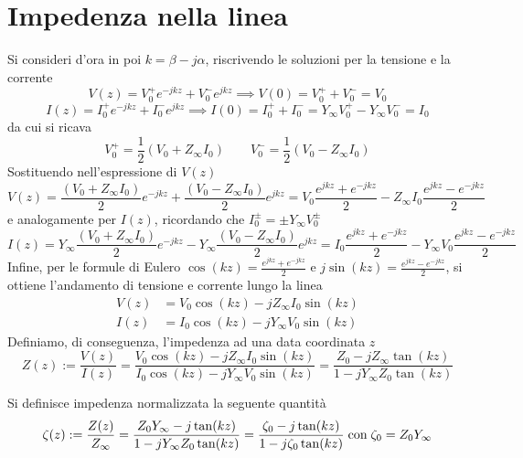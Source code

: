 \section{Impedenza nella linea}
    Si consideri d'ora in poi $k = \beta - j \alpha$, riscrivendo le soluzioni per la tensione e la corrente
    \[
        V(z) = V^+_0 e^{-jkz} + V^-_0 e^{jkz}
        \implies V(0) = V^+_0 + V^-_0 =
        V_0
    \]
    \[
        I(z) = I^+_0 e^{-jkz} + I^-_0 e^{jkz}
        \implies I(0) = I^+_0 + I^-_0 =
        Y_{\infty} V^+_0 - Y_{\infty} V^-_0 =
        I_0
    \]
    da cui si ricava
    \[
        V^+_0 = \frac{1}{2} (V_0 + Z_\infty I_0) \qquad V^-_0 = \frac{1}{2} (V_0 - Z_\infty I_0)
    \]
    Sostituendo nell'espressione di $V(z)$
    \[
        V(z) = \frac{(V_0 + Z_\infty I_0)}{2} e^{-jkz} + \frac{(V_0 - Z_\infty I_0)}{2} e^{jkz} =
        V_0 \frac{e^{jkz} + e^{-jkz}}{2} - Z_\infty I_0 \frac{e^{jkz} - e^{-jkz}}{2}
    \]
    e analogamente per $I(z)$, ricordando che $I^\pm_0 = \pm Y_\infty V^\pm_0$
    \[
        I(z) = Y_\infty \frac{(V_0 + Z_\infty I_0)}{2} e^{-jkz} - Y_\infty \frac{(V_0 - Z_\infty I_0)}{2} e^{jkz} =
        I_0 \frac{e^{jkz} + e^{-jkz}}{2} - Y_\infty V_0 \frac{e^{jkz} - e^{-jkz}}{2}
    \]
    Infine, per le formule di Eulero $\cos(kz) = \frac{e^{jkz} + e^{-jkz}}{2}$ e $j \sin(kz) = \frac{e^{jkz} - e^{-jkz}}{2}$, si ottiene l'andamento di tensione e corrente lungo la linea
    \[
        \begin{aligned}
            V(z) &= V_0 \cos(kz) - j Z_\infty I_0 \sin(kz) \\
            I(z) &= I_0 \cos(kz) - j Y_\infty V_0 \sin(kz)
        \end{aligned}
    \]
    Definiamo, di conseguenza, l'impedenza ad una data coordinata $z$
    \[
        Z(z) := \frac{V(z)}{I(z)} = \frac{V_0 \cos(kz) - j Z_\infty I_0 \sin(kz)}{I_0 \cos(kz) - j Y_\infty V_0 \sin(kz)} = \frac{Z_0 - j Z_\infty \tan(kz)}{1 - j Y_\infty Z_0 \tan(kz)}
    \]

    \begin{definition}
        Si definisce impedenza normalizzata la seguente quantità
        \[
            \zeta(z) := \frac{Z(z)}{Z_\infty} = \frac{Z_0 Y_\infty - j \tan(kz)}{1 - j Y_\infty Z_0 \tan(kz)} = \frac{\zeta_0 - j \tan(kz)}{1 - j \zeta_0 \tan(kz)} \; \textnormal{con} \; \zeta_0 = Z_0 Y_\infty
        \]
    \end{definition}

